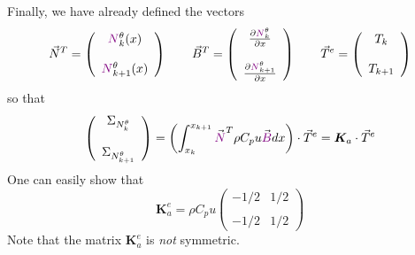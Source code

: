 Finally, we have already defined the vectors 
\[
{\vec N}^T = 
\left(
\begin{array}{c}
{\color{violet}N}_k^\theta(x)  \\ \\  {\color{violet}N}_{k+1}^\theta (x)
\end{array}
\right)
\quad\quad
{\vec B}^T=
\left(
\begin{array}{cc}
 \frac{\partial {\color{violet}N}_k^\theta}{\partial x}   \\ \\
 \frac{\partial {\color{violet}N}_{k+1}^\theta}{\partial x}
\end{array}
\right)
\quad
\quad
{\vec T}^e = 
\left(
\begin{array}{c}
T_k \\ \\ T_{k+1}
\end{array}
\right)
\]
so that 
\[
\left(
\begin{array}{c}
{\Sigma}_{N_k^\theta} \\  \\ {\Sigma}_{N_{k+1}^\theta}
\end{array}
\right)
=
\left( \int_{x_k}^{x_{k+1}}   {\vec {\color{violet}N}}^T \rho C_p u {\vec {\color{violet}B}} dx  \right) \cdot {\vec T}^e
= {\bm K}_a \cdot \vec T^e
\]
One can easily show that 
\[
{\bm K}_a^e=
\rho C_p u
\left(
\begin{array}{cc}
-1/2 & 1/2 \\ \\
-1/2 & 1/2 
\end{array}
\right)
\]
Note that the matrix ${\bm K}_a^e$ is {\sl not} symmetric. 

